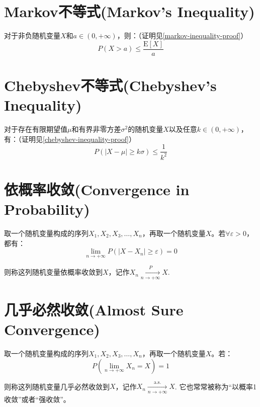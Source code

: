 \documentclass[UTF8]{ctexbook}
\begin{document}
\section{Markov不等式(Markov's Inequality)}
\label{markov-inequality}
对于非负随机变量$X$和$a\in(0,+\infty)$，则：（证明见\ref{markov-inequality-proof}）
\[
	P(X>a)\leq\frac{\mathrm E[X]}{a}
\]

\section{Chebyshev不等式(Chebyshev's Inequality)}
\label{chebyshev-inequality}
对于存在有限期望值$\mu$和有界非零方差$\sigma^2$的随机变量$X$以及任意$k\in(0,+\infty)$，有：（证明见\ref{chebyshev-inequality-proof}）
\[
	P(|X-\mu|\geq k\sigma)\leq\frac{1}{k^2}
\]
\section{依概率收敛(Convergence in Probability)}
\label{convg-in-prob}
取一个随机变量构成的序列$X_1,X_2,X_3,\dots,X_n$，再取一个随机变量$X$。若$\forall\varepsilon>0$，都有：
\[
	\lim_{n\to+\infty}P(|X-X_n|\geq\varepsilon)=0
\]

则称这列随机变量依概率收敛到$X$，记作$X_n\xrightarrow[n\to+\infty]{P}X$.
\section{几乎必然收敛(Almost Sure Convergence)}
取一个随机变量构成的序列$X_1,X_2,X_3,\dots,X_n$，再取一个随机变量$X$。若：
\[
	P(\lim_{n\to+\infty}X_n=X)=1
\]

则称这列随机变量几乎必然收敛到$X$，记作$X_n\xrightarrow[n\to+\infty]{\mathrm{a.s.}}X$. 它也常常被称为“以概率1收敛”或者“强收敛”。
\end{document}
